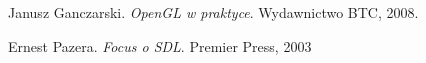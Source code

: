 \begin{thebibliography}{1}

Janusz Ganczarski. 
\emph{OpenGL w praktyce}. Wydawnictwo BTC, 2008.

Ernest Pazera. 
\emph{Focus o SDL}. Premier Press, 2003

\end{thebibliography}



 